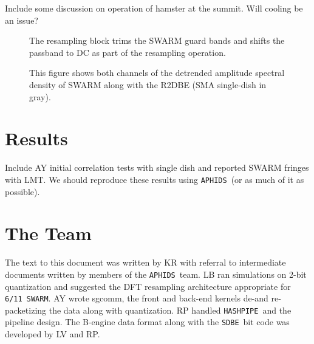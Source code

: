\documentclass[11pt,preprint]{aastex}
\newcommand{\SWARM}[1]{\texttt{#1\,SWARM}}
\newcommand{\SDBE}{\texttt{SDBE}}
\newcommand{\APHIDS}{\texttt{APHIDS}}
\newcommand{\HASHPIPE}{\texttt{HASHPIPE}}
\begin{document}
Include some discussion on operation of hamster at the summit.  Will cooling be an issue?


\begin{figure}
\centering
{}
\label{fig:resampling_block}
\caption{The resampling block trims the SWARM guard bands and shifts the passband to DC as part of the 
resampling operation.}
\end{figure}

\begin{figure}[H]
\caption{This figure shows both channels of the detrended amplitude spectral density of SWARM along with the 
R2DBE (SMA single-dish in gray).}
\label{fig:swarm_amp_spec}
\end{figure}

\section{Results}

Include AY initial correlation tests with single dish and reported SWARM fringes with LMT.
We should reproduce these results using \APHIDS\ (or as much of it as possible).

\section{The Team}
The text to this document was written by KR with referral to intermediate documents written by
members of the \APHIDS\ team.  LB ran simulations on 2-bit quantization and suggested the DFT resampling 
architecture appropriate for \SWARM{6/11}. AY wrote sgcomm, the front and back-end kernels de-and re-packetizing 
the data along with quantization. RP handled \HASHPIPE\, and the pipeline design.  The B-engine data format along 
with the \SDBE\, bit code was developed by LV and RP.

\acknowledgments 
\clearpage


\end{document}
